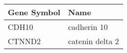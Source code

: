 \begin{tabular}{ll}
\toprule
Gene Symbol &            Name \\
\midrule
      CDH10 &     cadherin 10 \\
     CTNND2 & catenin delta 2 \\
\bottomrule
\end{tabular}
